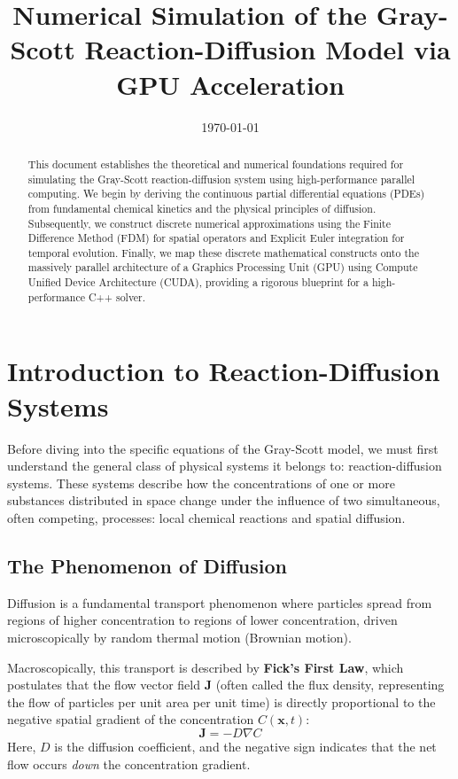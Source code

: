 \documentclass[12pt,a4paper]{article}
\title{Numerical Simulation of the Gray-Scott Reaction-Diffusion Model via GPU Acceleration}
\date{\today}
\begin{document}
\maketitle

\begin{abstract}
This document establishes the theoretical and numerical foundations required for simulating the Gray-Scott reaction-diffusion system using high-performance parallel computing. We begin by deriving the continuous partial differential equations (PDEs) from fundamental chemical kinetics and the physical principles of diffusion. Subsequently, we construct discrete numerical approximations using the Finite Difference Method (FDM) for spatial operators and Explicit Euler integration for temporal evolution. Finally, we map these discrete mathematical constructs onto the massively parallel architecture of a Graphics Processing Unit (GPU) using Compute Unified Device Architecture (CUDA), providing a rigorous blueprint for a high-performance C++ solver.
\end{abstract}

\newpage
\tableofcontents
\newpage

\section{Introduction to Reaction-Diffusion Systems}

Before diving into the specific equations of the Gray-Scott model, we must first understand the general class of physical systems it belongs to: reaction-diffusion systems. These systems describe how the concentrations of one or more substances distributed in space change under the influence of two simultaneous, often competing, processes: local chemical reactions and spatial diffusion.

\subsection{The Phenomenon of Diffusion}
Diffusion is a fundamental transport phenomenon where particles spread from regions of higher concentration to regions of lower concentration, driven microscopically by random thermal motion (Brownian motion).

Macroscopically, this transport is described by \textbf{Fick's First Law}, which postulates that the flow vector field $\mathbf{J}$ (often called the flux density, representing the flow of particles per unit area per unit time) is directly proportional to the negative spatial gradient of the concentration $C(\mathbf{x}, t)$:
$$\mathbf{J} = -D \nabla C$$
Here, $D$ is the diffusion coefficient, and the negative sign indicates that the net flow occurs \textit{down} the concentration gradient.
\end{document}
